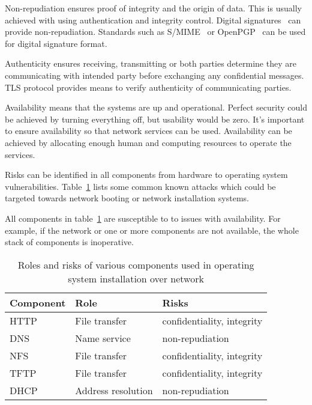 Non-repudiation ensures proof of integrity and the origin of
data. This is usually achieved with using authentication and integrity
control. Digital signatures~\cite{Diffie2006}\cite{Goldwasser1988} can
provide non-repudiation. Standards such as S/MIME~\cite{RFC5751} or
OpenPGP~\cite{RFC4880} can be used for digital signature format.

Authenticity ensures receiving, transmitting or both parties determine
they are communicating with intended party before exchanging any
confidential messages. TLS protocol provides means to verify
authenticity of communicating parties.

Availability means that the systems are up and operational. Perfect
security could be achieved by turning everything off, but usability
would be zero. It's important to ensure availability so that network
services can be used. Availability can be achieved by allocating
enough human and computing resources to operate the services.

Risks can be identified in all components from hardware to operating
system vulnerabilities. Table~\ref{tab:risks_table} lists some
common known attacks which could be targeted towards network booting
or network installation systems.

All components in table~\ref{tab:risks_table} are susceptible to to
issues with availability. For example, if the network or one or more
components are not available, the whole stack of components is
inoperative.

\begin{table}[!ht]
  \def\arraystretch{1.1}%
  \begin{center}
    \begin{tabular}{| l | l | l |}
      \hline
      Component   & Role               & Risks                      \\
      \hline
      HTTP        & File transfer      & confidentiality, integrity \\
      DNS         & Name service       & non-repudiation            \\
      NFS         & File transfer      & confidentiality, integrity \\
      TFTP        & File transfer      & confidentiality, integrity \\
      DHCP        & Address resolution & non-repudiation            \\
      \hline
    \end{tabular}
    \caption{Roles and risks of various components used in operating
      system installation over network\label{tab:risks_table}}
  \end{center}
\end{table}


